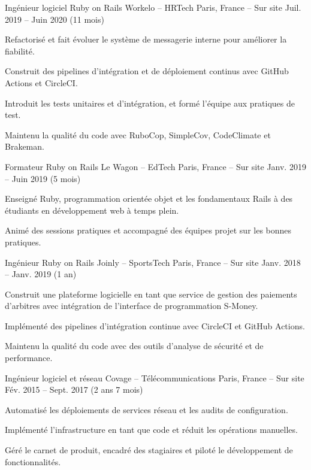 \begin{cventries}
\cventry
  {Ingénieur logiciel Ruby on Rails}
  {Workelo – HRTech}
  {Paris, France – Sur site}
  {Juil. 2019 – Juin 2020 (11 mois)}
  {
    \begin{cvitems}
      \item {Refactorisé et fait évoluer le système de messagerie interne pour améliorer la fiabilité.}
      \item {Construit des pipelines d'intégration et de déploiement continus avec GitHub Actions et CircleCI.}
      \item {Introduit les tests unitaires et d'intégration, et formé l'équipe aux pratiques de test.}
      \item {Maintenu la qualité du code avec RuboCop, SimpleCov, CodeClimate et Brakeman.}
    \end{cvitems}
  }

\cventry
  {Formateur Ruby on Rails}
  {Le Wagon – EdTech}
  {Paris, France – Sur site}
  {Janv. 2019 – Juin 2019 (5 mois)}
  {
    \begin{cvitems}
      \item {Enseigné Ruby, programmation orientée objet et les fondamentaux Rails à des étudiants en développement web à temps plein.}
      \item {Animé des sessions pratiques et accompagné des équipes projet sur les bonnes pratiques.}
    \end{cvitems}
  }

\cventry
  {Ingénieur Ruby on Rails}
  {Joinly – SportsTech}
  {Paris, France – Sur site}
  {Janv. 2018 – Janv. 2019 (1 an)}
  {
    \begin{cvitems}
      \item {Construit une plateforme logicielle en tant que service de gestion des paiements d'arbitres avec intégration de l'interface de programmation S-Money.}
      \item {Implémenté des pipelines d'intégration continue avec CircleCI et GitHub Actions.}
      \item {Maintenu la qualité du code avec des outils d'analyse de sécurité et de performance.}
    \end{cvitems}
  }

\cventry
  {Ingénieur logiciel et réseau}
  {Covage – Télécommunications}
  {Paris, France – Sur site}
  {Fév. 2015 – Sept. 2017 (2 ans 7 mois)}
  {
    \begin{cvitems}
      \item {Automatisé les déploiements de services réseau et les audits de configuration.}
      \item {Implémenté l'infrastructure en tant que code et réduit les opérations manuelles.}
      \item {Géré le carnet de produit, encadré des stagiaires et piloté le développement de fonctionnalités.}
    \end{cvitems}
  }

\end{cventries}

